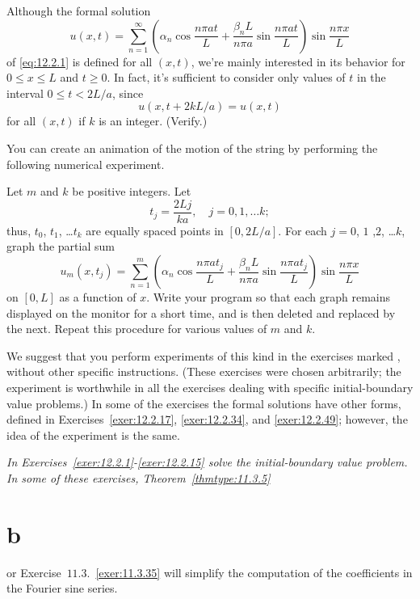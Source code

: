 \technology
\medskip

Although the formal solution
\[
  u(x,t)=\sum_{n=1}^{\infty}\left(\alpha_{n}\cos\frac{n\pi at}{L}+\frac{\beta_{n}L}{n\pi a}\sin\frac{n\pi at}{L}\right) \sin\frac{n\pi x}{L}
\]
of \eqref{eq:12.2.1} is defined for all $(x,t)$, we're mainly interested in its behavior for
$0\le x\le L$ and $t\ge0$. In fact, it's sufficient to consider only values of $t$ in the interval
$0\le t<2L/a$, since
\[
  u(x,t+2kL/a)=u(x,t)
\]
for all $(x,t)$ if $k$ is an integer. (Verify.)

You can create an animation of the motion of the string by performing the following numerical
experiment.

Let $m$ and $k$ be positive integers. Let
\[
  t_{j}=\frac{2Lj}{ka},\quad j=0,1,\dots k;
\]
thus, $t_{0}$, $t_{1}$, \dots $t_{k}$ are equally spaced points in $[0,2L/a]$. For each $j=0$, $1$
,$2$, \dots $k$, graph the partial sum
\[
  u_{m}(x,t_{j})=\sum_{n=1}^{m}\left(\alpha_{n}\cos\frac{n\pi at_{j}}{L}+\frac{\beta_{n}L}{n\pi a}\sin\frac{n\pi at_{j}}{L}\right) \sin\frac{n\pi x}{L}
\]
on $[0,L]$ as a function of $x$. Write your program so that each graph remains displayed on the
monitor for a short time, and is then deleted and replaced by the next. Repeat this procedure for
various values of $m$ and $k$.

We suggest that you perform experiments of this kind in the exercises marked \Cex\hspace*{-3pt},
without other specific instructions. (These exercises were chosen arbitrarily; the experiment is
worthwhile in all the exercises dealing with specific initial-boundary value problems.) In some of
the exercises the formal solutions have other forms, defined in Exercises~\ref{exer:12.2.17},
\ref{exer:12.2.34}, and \ref{exer:12.2.49}; however, the idea of the experiment is the same.

\exercises
\noindent

\noindent
{\it In Exercises~\ref{exer:12.2.1}-\ref{exer:12.2.15} solve the initial-boundary value problem. In
some of these exercises, Theorem~\ref{thmtype:11.3.5}\part{b} or
Exercise~$11.3$.~\hspace*{-3pt}\ref{exer:11.3.35} will simplify the computation of the coefficients
in the Fourier sine series.}

